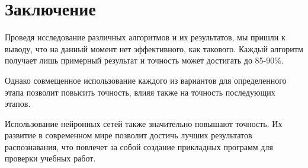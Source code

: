 \chapter*{Заключение} \label{ch-conclusion}

Проведя исследование различных алгоритмов и их результатов, мы пришли к выводу, что на данный момент нет эффективного, как такового. Каждый алгоритм получает лишь примерный результат и точность может достигать до 85-90\%. 

Однако совмещенное использование каждого из вариантов для определенного этапа позволит повысить точность, влияя также на точность последующих этапов. 

Использование нейронных сетей также значительно повышают точность. Их развитие в современном мире позволит достичь лучших результатов распознавания, что повлечет за собой создание прикладных программ для проверки учебных работ.

